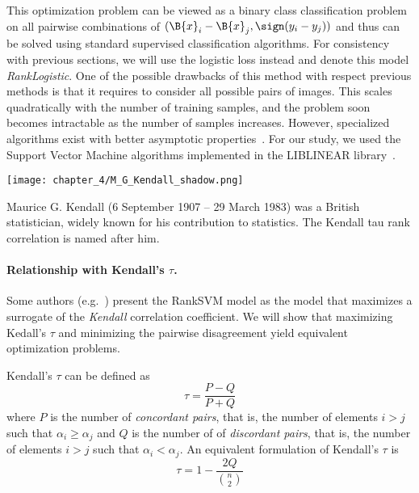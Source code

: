 This optimization problem can be viewed as a binary class classification problem on all pairwise combinations of $(\B{x}_i - \B{x}_j, \sign(y_i - y_j))$ and thus can be solved using standard supervised classification algorithms. For consistency with previous sections, we will use the logistic loss instead and denote this model \emph{RankLogistic}. One of
the possible drawbacks of this method with respect previous methods is that it requires to consider
all possible pairs of images. This scales quadratically with the
number of training samples, and the problem soon becomes intractable
as the number of samples increases. However, specialized algorithms
exist with better asymptotic
properties~\citep{Joachims:2006:TLS:1150402.1150429, Sculley}. For our study, we
used the Support Vector Machine algorithms implemented in the LIBLINEAR library~\citep{fan2008liblinear}.










\begin{marginfigure}
\texttt{[image: chapter\_4/M\_G\_Kendall\_shadow.png]}
\caption{Maurice G. Kendall (6 September 1907 -- 29 March 1983) was a British statistician, widely known for his contribution to statistics. The Kendall tau rank correlation is named after him.}
\end{marginfigure}

\paragraph{Relationship with Kendall's $\tau$.}Some authors (e.g.~\citep{Joachims2002, chen2009unified, wauthier2013efficient}) present the RankSVM model as the model that maximizes a surrogate of the \emph{\gls{Kendall}} correlation coefficient. We will show that maximizing Kedall's $\tau$ and minimizing the pairwise disagreement yield equivalent optimization problems.

Kendall's $\tau$ can be defined as 
$$
\tau = \frac{P - Q}{P + Q}
$$
where $P$ is the number of \emph{concordant pairs}, that is, the number of elements $i > j$ such that $\alpha_i \geq \alpha_j$ and $Q$ is the number of of \emph{discordant pairs}, that is, the number of elements $i > j$ such that $\alpha_i < \alpha_j$. An equivalent formulation of Kendall's $\tau$ is~\citep{Joachims2002}
$$
\tau = 1 - \frac{2 Q}{\binom{n}{2}}
$$


